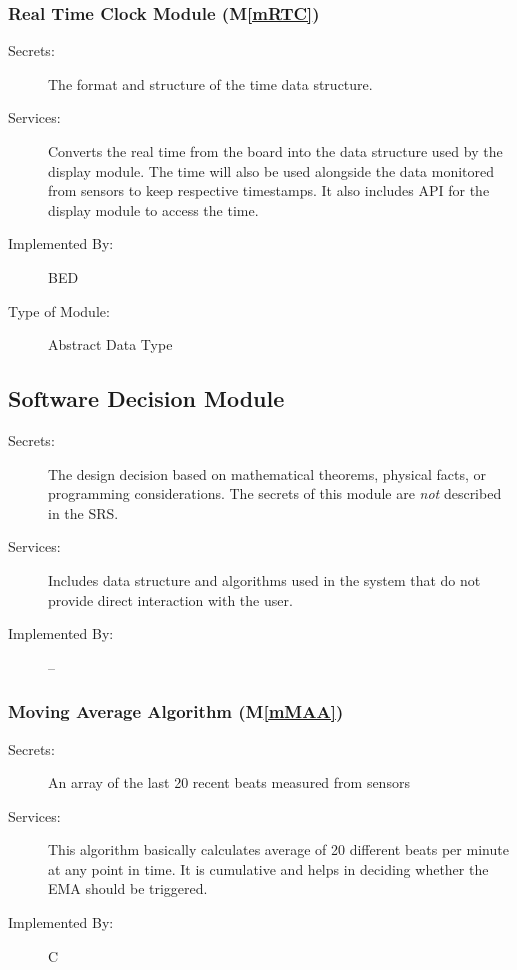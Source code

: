 \documentclass[12pt, titlepage]{article}
\newcommand{\mref}[1]{M\ref{#1}}
\begin{document}
\subsubsection{Real Time Clock Module (\mref{mRTC})}

\begin{description}
  \item[Secrets:]The format and structure of the time data structure.
  \item[Services:] Converts the real time from the board into the data structure used by the
    display module. The time will also be used alongside the data monitored from sensors to keep respective timestamps. It also includes API for the display module to access the time.
  \item[Implemented By:] BED
  \item[Type of Module:] Abstract Data Type
\end{description}


\subsection{Software Decision Module}

\begin{description}
  \item[Secrets:] The design decision based on mathematical theorems, physical
    facts, or programming considerations. The secrets of this module are
    \emph{not} described in the SRS.
  \item[Services:] Includes data structure and algorithms used in the system that
    do not provide direct interaction with the user.
  \item[Implemented By:] --
\end{description}



\subsubsection{Moving Average Algorithm (\mref{mMAA})}

\begin{description}
  \item[Secrets:] An array of the last 20 recent beats measured from sensors
  \item[Services:] This algorithm basically calculates average of 20 different beats per minute at any point in time. It is cumulative and helps in deciding whether the EMA should be triggered.
  \item[Implemented By:] C
\end{description}
\end{document}
